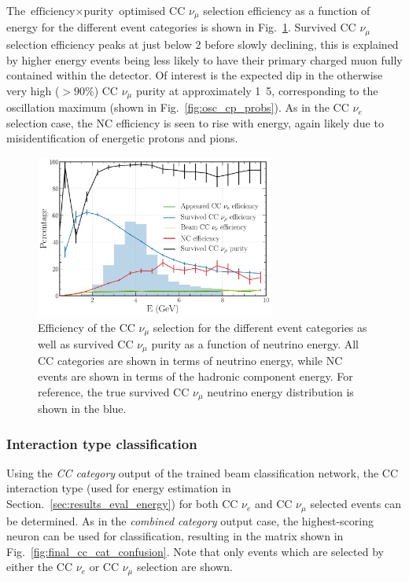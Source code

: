 The $\text{efficiency}\times\text{purity}$ optimised CC $\nu_{\mu}$ selection efficiency as a
function of energy for the different event categories is shown in Fig.~\ref{fig:final_numu_hists}.
Survived CC $\nu_{\mu}$ selection efficiency peaks at just below \unit{2}{\GeV} before slowly
declining, this is explained by higher energy events being less likely to have their primary
charged muon fully contained within the detector. Of interest is the expected dip in the otherwise
very high ($>90\%$) CC $\nu_{\mu}$ purity at approximately \unit{1.5}{\GeV}, corresponding to the
oscillation maximum (shown in Fig.~\ref{fig:osc_cp_probs}). As in the CC $\nu_{e}$ selection case,
the NC efficiency is seen to rise with energy, again likely due to misidentification of energetic
protons and pions.

\begin{figure} %
    \includegraphics[width=0.7\textwidth]{diagrams/7-results/final_numu_hists.pdf}
    \caption[Efficiency of the CC $\nu_{\mu}$ selection as a function of energy]
    {Efficiency of the CC $\nu_{\mu}$ selection for the different event categories as well as
        survived CC $\nu_{\mu}$ purity as a function of neutrino energy. All CC categories are
        shown in terms of neutrino energy, while NC events are shown in terms of the hadronic
        component energy. For reference, the true survived CC $\nu_{\mu}$ neutrino energy
        distribution is shown in the blue.}
    \label{fig:final_numu_hists}
\end{figure}

\subsubsection*{Interaction type classification} %

Using the \emph{CC category} output of the trained beam classification network, the CC interaction
type (used for energy estimation in Section.~\ref{sec:results_eval_energy}) for both CC $\nu_{e}$
and CC $\nu_{\mu}$ selected events can be determined. As in the \emph{combined category} output
case, the highest-scoring neuron can be used for classification, resulting in the matrix shown in
Fig.~\ref{fig:final_cc_cat_confusion}. Note that only events which are selected by either the CC
$\nu_{e}$ or CC $\nu_{\mu}$ selection are shown.

